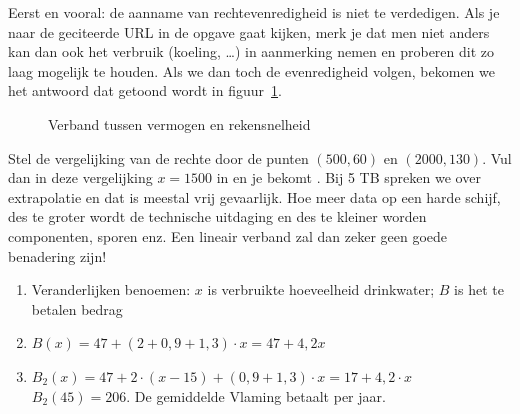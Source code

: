 \begin{Oplossing}{3.4}
Eerst en vooral: de aanname van rechtevenredigheid is niet te verdedigen. Als je naar de geciteerde URL in de opgave gaat kijken, merk je dat men niet anders kan dan ook het verbruik (koeling, \ldots) in aanmerking nemen en proberen dit zo laag mogelijk te houden. Als we dan toch de evenredigheid volgen, bekomen we het antwoord dat getoond wordt in figuur~\ref{fig:rekensnelheidvermogen}.
\begin{figure}[htbp]
    \centering
{}
\caption{Verband tussen vermogen en rekensnelheid}
    \label{fig:rekensnelheidvermogen}
\end{figure}
\end{Oplossing}
\begin{Oplossing}{3.5}
Stel de vergelijking van de rechte door de punten $(500,60)$ en $(2000,130)$. Vul dan in deze vergelijking $x=1500$ in en je bekomt . Bij 5 TB spreken we over extrapolatie en dat is meestal vrij gevaarlijk. Hoe meer data op een harde schijf, des te groter wordt de technische uitdaging en des te kleiner worden componenten, sporen enz. Een lineair verband zal dan zeker geen goede benadering zijn!
\end{Oplossing}
\begin{Oplossing}{3.6}
\begin{enumerate}
\item Veranderlijken benoemen: $x$ is verbruikte hoeveelheid drinkwater; $B$ is het te betalen bedrag
\item $B(x)=47+(2+0,9+1,3)\cdot x=47+4,2x$
\item $B_2(x)=47+2\cdot (x-15)+(0,9+1,3)\cdot x=17+4,2\cdot x$ \\
$B_2(45)=206$. De gemiddelde Vlaming betaalt  per jaar.
\end{enumerate}
\end{Oplossing}
